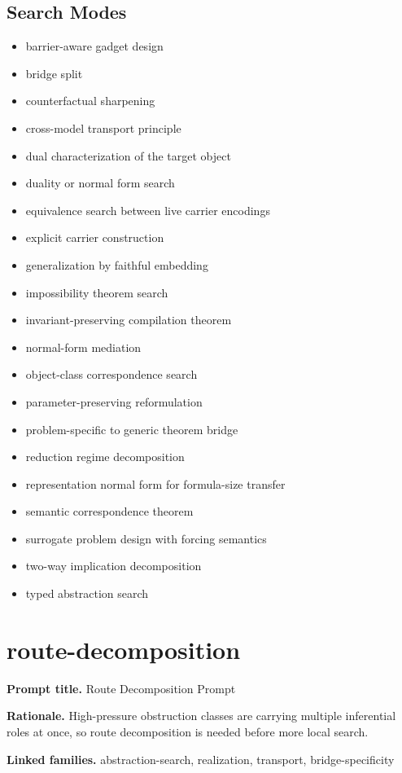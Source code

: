 \documentclass[11pt]{article}
\begin{document}
\subsection*{Search Modes}
\begin{itemize}[leftmargin=*,itemsep=0.2em]
\item barrier-aware gadget design
\item bridge split
\item counterfactual sharpening
\item cross-model transport principle
\item dual characterization of the target object
\item duality or normal form search
\item equivalence search between live carrier encodings
\item explicit carrier construction
\item generalization by faithful embedding
\item impossibility theorem search
\item invariant-preserving compilation theorem
\item normal-form mediation
\item object-class correspondence search
\item parameter-preserving reformulation
\item problem-specific to generic theorem bridge
\item reduction regime decomposition
\item representation normal form for formula-size transfer
\item semantic correspondence theorem
\item surrogate problem design with forcing semantics
\item two-way implication decomposition
\item typed abstraction search
\end{itemize}
\section{route-decomposition}
\textbf{Prompt title.} Route Decomposition Prompt

\textbf{Rationale.} High-pressure obstruction classes are carrying multiple inferential roles at once, so route decomposition is needed before more local search.

\textbf{Linked families.} abstraction-search, realization, transport, bridge-specificity
\end{document}
